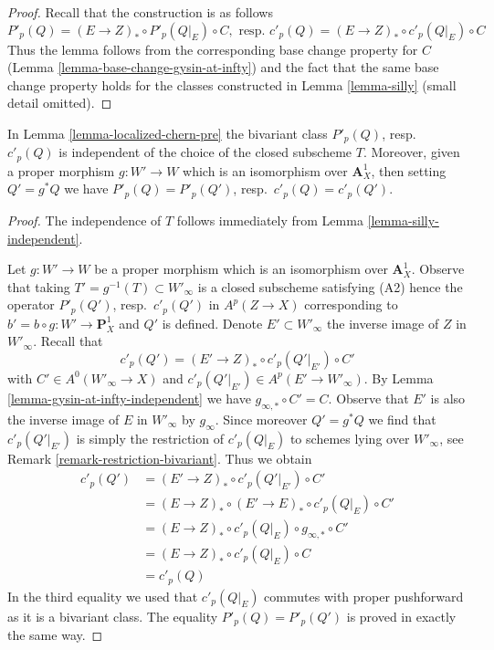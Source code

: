 \begin{proof}
Recall that the construction is as follows
$$
P'_p(Q) = (E \to Z)_* \circ P'_p(Q|_E) \circ C,\text{ resp. }
c'_p(Q) = (E \to Z)_* \circ c'_p(Q|_E) \circ C
$$
Thus the lemma follows from the corresponding base change property
for $C$ (Lemma \ref{lemma-base-change-gysin-at-infty})
and the fact that the same base change property holds for the classes
constructed in Lemma \ref{lemma-silly} (small detail omitted).
\end{proof}

\begin{lemma}
\label{lemma-localized-chern-pre-independent}
In Lemma \ref{lemma-localized-chern-pre} the bivariant class
$P'_p(Q)$, resp.\ $c'_p(Q)$
is independent of the choice of the closed subscheme $T$.
Moreover, given a proper morphism $g : W' \to W$ which is an
isomorphism over $\mathbf{A}^1_X$, then setting $Q' = g^*Q$
we have $P'_p(Q) = P'_p(Q')$, resp.\ $c'_p(Q) = c'_p(Q')$.
\end{lemma}

\begin{proof}
The independence of $T$ follows immediately from
Lemma \ref{lemma-silly-independent}.

\medskip\noindent
Let $g : W' \to W$ be a proper morphism which is an isomorphism over
$\mathbf{A}^1_X$. Observe that taking $T' = g^{-1}(T) \subset W'_\infty$
is a closed subscheme satisfying (A2) hence the operator
$P'_p(Q')$, resp.\ $c'_p(Q')$ in $A^p(Z \to X)$
corresponding to $b' = b \circ g : W' \to \mathbf{P}^1_X$
and $Q'$ is defined. Denote $E' \subset W'_\infty$
the inverse image of $Z$ in $W'_\infty$. Recall that
$$
c'_p(Q') = (E' \to Z)_* \circ c'_p(Q'|_{E'}) \circ C'
$$
with $C' \in A^0(W'_\infty \to X)$ and
$c'_p(Q'|_{E'}) \in A^p(E' \to W'_\infty)$.
By Lemma \ref{lemma-gysin-at-infty-independent} we have
$g_{\infty, *} \circ C' = C$. Observe that $E'$ is also
the inverse image of $E$ in $W'_\infty$ by $g_\infty$.
Since moreover $Q' = g^*Q$ we find that $c'_p(Q'|_{E'})$ is simply the
restriction of $c'_p(Q|_E)$ to schemes lying over $W'_\infty$, see
Remark \ref{remark-restriction-bivariant}. Thus we obtain
\begin{align*}
c'_p(Q')
& = 
(E' \to Z)_* \circ c'_p(Q'|_{E'}) \circ C' \\
& =
(E \to Z)_* \circ (E' \to E)_* \circ c'_p(Q|_E) \circ C' \\
& =
(E \to Z)_* \circ c'_p(Q|_E) \circ g_{\infty, *} \circ C' \\
& =
(E \to Z)_* \circ c'_p(Q|_E) \circ C \\
& =
c'_p(Q)
\end{align*}
In the third equality we used that $c'_p(Q|_E)$
commutes with proper pushforward as it is a
bivariant class. The equality $P'_p(Q) = P'_p(Q')$
is proved in exactly the same way.
\end{proof}


